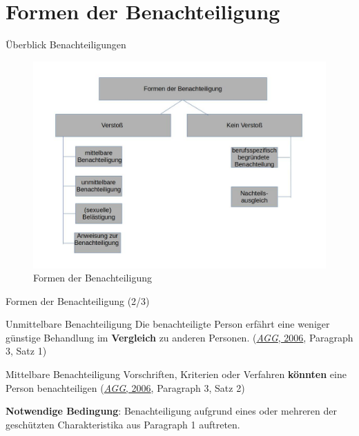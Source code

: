 \documentclass[
  10pt,
  ngerman,
  ignorenonframetext,
]{beamer}
\begin{document}
\hypertarget{formen-der-benachteiligung}{%
\section{Formen der Benachteiligung}\label{formen-der-benachteiligung}}

\begin{frame}{Überblick Benachteiligungen}
\protect\hypertarget{uxfcberblick-benachteiligungen}{}
\begin{figure}
\centering
\includegraphics[width=\textwidth,height=0.75\textheight]{plots/benachteiligung.jpg}
\caption{Formen der Benachteiligung}
\end{figure}
\end{frame}

\begin{frame}{Formen der Benachteiligung (2/3)}
\protect\hypertarget{formen-der-benachteiligung-23}{}
\begin{block}{Unmittelbare Benachteiligung}
\protect\hypertarget{unmittelbare-benachteiligung}{}
Die benachteiligte Person erfährt eine weniger günstige Behandlung im
\textbf{Vergleich} zu anderen Personen.
(\protect\hyperlink{ref-agg}{\emph{AGG}, 2006}, Paragraph 3, Satz 1)
\end{block}

\begin{block}{Mittelbare Benachteiligung}
\protect\hypertarget{mittelbare-benachteiligung}{}
Vorschriften, Kriterien oder Verfahren \textbf{könnten} eine Person
benachteiligen (\protect\hyperlink{ref-agg}{\emph{AGG}, 2006}, Paragraph
3, Satz 2)~

\textbf{Notwendige Bedingung}: Benachteiligung aufgrund eines oder
mehreren der geschützten Charakteristika aus Paragraph 1 auftreten.
\end{block}
\end{frame}
\end{document}
